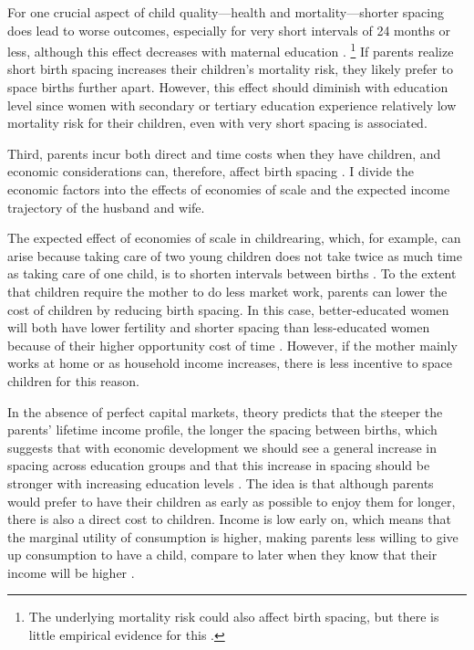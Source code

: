 For one crucial aspect of child quality---health and mortality---shorter spacing 
does lead to worse outcomes, especially for very short intervals of 24 months 
or less, although this effect decreases with maternal education
\citep{Whitworth2002,Conde-Agudelo2006,Conde-Agudelo2012,Molitoris2019}.%
\footnote{
The underlying mortality risk could also affect birth spacing, but
there is little empirical evidence for this 
\citep{Newman1983,Newman1988,Bhalotra2008}.
}
If parents realize short birth spacing increases their children's mortality risk, 
they likely prefer to space births further apart.
However, this effect should diminish with education level since women with 
secondary or tertiary education experience relatively low mortality risk for 
their children, even with very short spacing is associated.


Third, parents incur both direct and time costs when they have children, 
and economic considerations can, therefore, affect birth spacing 
\citep{Hotz1997,schultz97}.
I divide the economic factors into the effects of economies of scale and
the expected income trajectory of the husband and wife.

The expected effect of economies of scale in childrearing, which, for example, 
can arise because taking care of two young children does not take twice as much 
time as taking care of one child, is to shorten intervals between births
\citep{Vijverberg1982}.
To the extent that children require the mother to do less market work, parents 
can lower the cost of children by reducing birth spacing.
In this case, better-educated women will both have lower fertility and shorter
spacing than less-educated women because of their higher opportunity cost of time 
\citep{Ross1974,Newman1984}.
However, if the mother mainly works at home or as household income increases, there 
is less incentive to space children for this reason.

In the absence of perfect capital markets, theory predicts that the steeper 
the parents' lifetime income profile, the longer the spacing between births, 
which suggests that with economic development we should see a general increase 
in spacing across education groups and that this increase in spacing should be 
stronger with increasing education levels
\citep{Heckman1976,wolpin84,Newman1988}.
The idea is that although parents would prefer to have their children as early 
as possible to enjoy them for longer, there is also a direct cost to children.
Income is low early on, which means that the marginal utility of consumption is 
higher, making parents less willing to give up consumption to have a child, 
compare to later when they know that their income will be higher 
\citep{Newman1984,Happel1984}.

